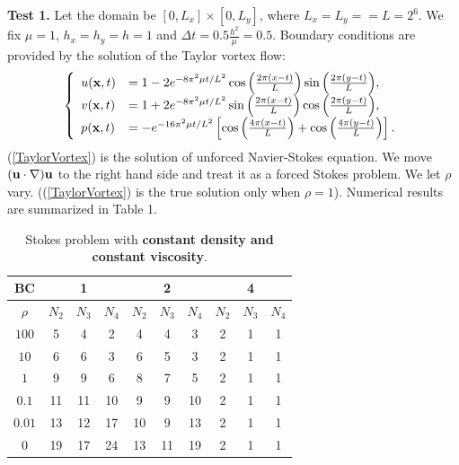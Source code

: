 \documentclass[9pt]{article}
\begin{document}
{\bf Test 1.} Let the domain be $[0, L_x] \times [0, L_y]$, where $L_x=L_y==L=2^{6}$. We fix $\mu =1$, $h_x=h_y=h=1$ and $\Delta t= 0.5 \frac{h^2}{\mu }= 0.5$. Boundary conditions are provided by the solution of the Taylor vortex flow:
\begin{equation}\label{TaylorVortex}
 \left \{
  \begin{array} {lll}
u({\bf x}, t)&=1 - 2e^{-8\pi^2\mu t/L^2}\cos{\left(\frac{2\pi(x-t)}{L}\right)}\sin{\left(\frac{2\pi(y-t)}{L}\right)},  \\
v({\bf x}, t)&=1 + 2e^{-8\pi^2\mu t/L^2}\sin{\left(\frac{2\pi(x-t)}{L}\right)}\cos{\left(\frac{2\pi(y-t)}{L}\right)}, \\
p({\bf x}, t)&= -e^{-16\pi^2\mu t/L^2}\left[\cos{\left(\frac{4\pi(x-t)}{L}\right)} + \cos{\left(\frac{4\pi(y-t)}{L}\right)}\right].
  \end{array}
 \right.
\end{equation}
(\ref{TaylorVortex}) is the solution of unforced Navier-Stokes equation. We move $({\bf u} \cdot \nabla){\bf u}$ to the right hand side and treat it as a forced Stokes problem. We let $\rho$ vary. ((\ref{TaylorVortex}) is the true solution only when $\rho=1$). Numerical results are summarized in Table 1.


\begin{table}[h]
\begin{center}
\begin{tabular}{|c||ccc|ccc|ccc|}
\hline
  BC         &       &1     &      &     &2     &     &    &4  & \\
\hline
$\rho$ &$N_2$ &$N_3$ &$N_4$  &$N_2$ &$N_3$ &$N_4$ &$N_2$ & $N_3$ &$N_4$  \\
\hline
\hline
$100$      &5   &4    &2    &4  &4  &3    &2  &1  &1 \\
\hline
$10$       &6   &6    &3    &6  &5  &3    &2  &1  &1\\
\hline
$1$        &9   &9    &6    &8  &7  &5    &2  &1 &1\\
\hline
$0.1$      &11 &11   &10    &9  &9  &10   &2  &1 &1\\
\hline
$0.01$     &13 &12   &17    &10 &9  &13   &2  &1 &1\\
\hline
$0$        &19 &17   &24    &13 &11 &19   &2  &1 &1\\
\hline
\end{tabular}
\vspace{2mm} \caption{Stokes problem with {\bf constant density and constant viscosity}.
}
\end{center}
\end{table}
\end{document}
